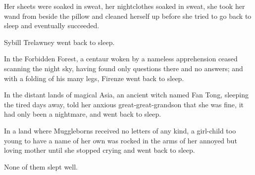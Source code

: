 Her sheets were soaked in sweat, her nightclothes soaked in sweat, she took her
wand from beside the pillow and cleaned herself up before she tried to go back
to sleep and eventually succeeded.

Sybill Trelawney went back to sleep.

In the Forbidden Forest, a centaur woken by a nameless apprehension ceased
scanning the night sky, having found only questions there and no answers; and
with a folding of his many legs, Firenze went back to sleep.

In the distant lands of magical Asia, an ancient witch named Fan Tong, sleeping
the tired days away, told her anxious great-great-grandson that she was fine,
it had only been a nightmare, and went back to sleep.

In a land where Muggleborns received no letters of any kind, a girl-child too
young to have a name of her own was rocked in the arms of her annoyed but
loving mother until she stopped crying and went back to sleep.

None of them slept well.
